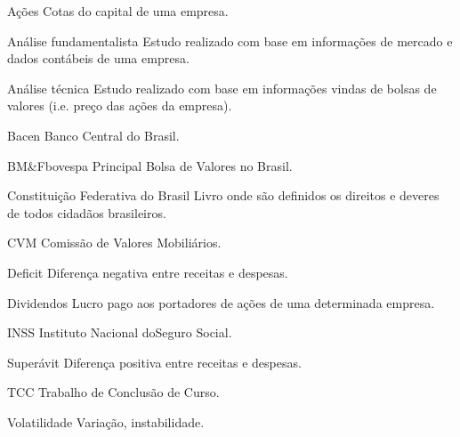 \begin{siglas}

  \item[Ações] Cotas do capital de uma empresa.
  \item[Análise fundamentalista] Estudo realizado com base em informações de mercado e dados contábeis de uma empresa.
  \item[Análise técnica] Estudo realizado com base em informações vindas de bolsas de valores (i.e. preço das ações da empresa).
  \item[Bacen] Banco Central do Brasil.
  \item[BM\&Fbovespa] Principal Bolsa de Valores no Brasil.
  \item[Constituição Federativa do Brasil] Livro onde são definidos os direitos e deveres de todos cidadãos brasileiros.
  \item[CVM] Comissão de Valores Mobiliários.
  \item[Deficit] Diferença negativa entre receitas e despesas.
  \item[Dividendos] Lucro pago aos portadores de ações de uma determinada empresa.
  \item[INSS] Instituto Nacional doSeguro Social.
  \item[Superávit] Diferença positiva entre receitas e despesas.
  \item[TCC] Trabalho de Conclusão de Curso.
  \item[Volatilidade] Variação, instabilidade.
 

\end{siglas}
